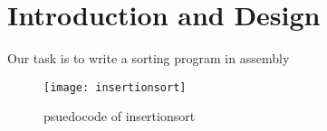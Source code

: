 \section{Introduction and Design}

Our task is to write a sorting program in assembly


\begin{figure}[h]
  \centering
  \texttt{[image: insertionsort]}
 \caption{psuedocode of insertionsort}
\end{figure}











